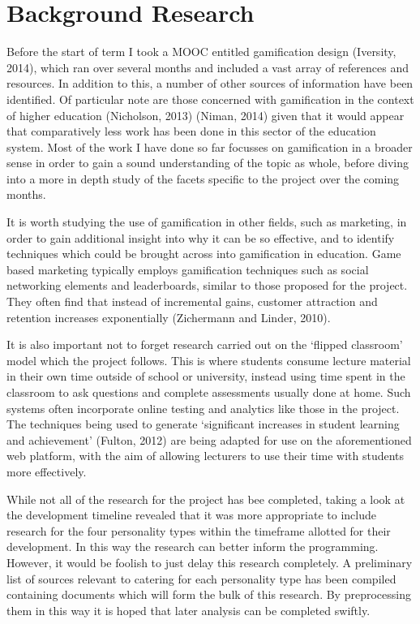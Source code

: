 \documentclass[10pt,a4paper]{report}
\begin{document}
\section*{Background Research}
Before the start of term I took a MOOC entitled gamification design (Iversity, 2014), which ran over several months and included a vast array of references and resources. In addition to this, a number of other sources of information have been identified. Of particular note are those concerned with gamification in the context of higher education (Nicholson, 2013) (Niman, 2014) given that it would appear that comparatively less work has been done in this sector of the education system. Most of the work I have done so far focusses on gamification in a broader sense in order to gain a sound understanding of the topic as whole, before diving into a more in depth study of the facets specific to the project over the coming months.

It is worth studying the use of gamification in other fields, such as marketing, in order to gain additional insight into why it can be so effective, and to identify techniques which could be brought across into gamification in education. Game based marketing typically employs gamification techniques such as social networking elements and leaderboards, similar to those proposed for the project. They often find that instead of incremental gains, customer attraction and retention increases exponentially (Zichermann and Linder, 2010). 

It is also important not to forget research carried out on the `flipped classroom' model which the project follows. This is where students consume lecture material in their own time outside of school or university, instead using time spent in the classroom to ask questions and complete assessments usually done at home. Such systems often incorporate online testing and analytics like those in the project. The techniques being used to generate `significant increases in student learning and achievement' (Fulton, 2012) are being adapted for use on the aforementioned web platform, with the aim of allowing lecturers to use their time with students more effectively.

While not all of the research for the project has bee completed, taking a look at the development timeline revealed that it was more appropriate to include research for the four personality types within the timeframe allotted for their development. In this way the research can better inform the programming. However, it would be foolish to just delay this research completely. A preliminary list of sources relevant to catering for each personality type has been compiled containing documents which will form the bulk of this research. By preprocessing them in this way it is hoped that later analysis can be completed swiftly.
\end{document}
